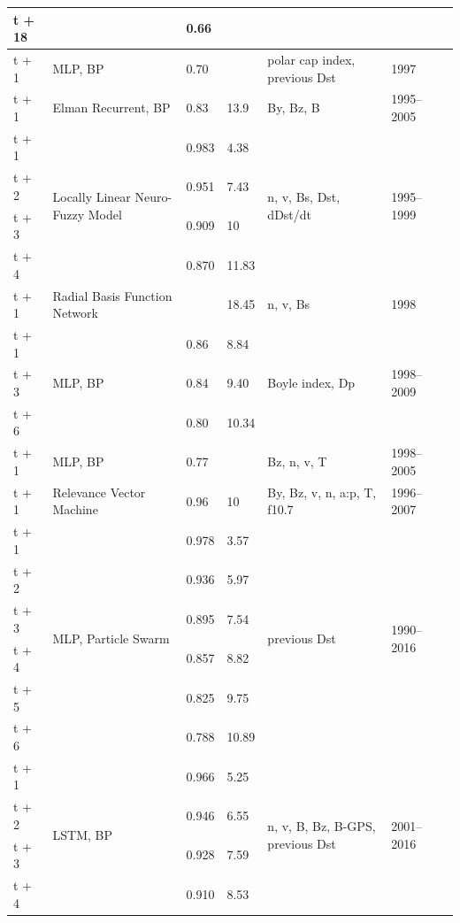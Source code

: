 \documentclass{agujournal2018}
\begin{document}
\begin{table}[htpb]
\begin{tabular}{l p{2.5cm} l l p{2.5cm} p{0.8cm} l}
t + 18 &  & 0.66 &  &&  & \\ \hline
t + 1 & MLP, BP & 0.70 &  & polar cap index, previous Dst & 1997 & \cite{Stepanova2005} \\ \hline
t + 1 & Elman Recurrent, BP & 0.83 & 13.9 & By, Bz, B & 1995--2005 & \cite{Pallocchia2006} \\ \hline
t + 1 & \multirow{4}{2.5cm}{Locally Linear Neuro-Fuzzy Model} & 0.983 & 4.38 & \multirow{4}{2cm}{n, v, Bs, Dst, dDst/dt} &  \multirow{4}{0.8cm}{1995--1999} &  \multirow{4}{*}{\cite{Sharifie2006}} \\ 
t + 2 &  & 0.951 & 7.43 &&  & \\
t + 3 &  & 0.909 & 10 &&  &  \\
t + 4 &  & 0.870 & 11.83 && & \\ \hline
t + 1 & Radial Basis Function Network &  & 18.45 & n, v, Bs & 1998 & \cite{Wei2007} \\ \hline
t + 1 & \multirow{3}{2.5cm}{MLP, BP} & 0.86 & 8.84 & \multirow{3}{2.5cm}{Boyle index, Dp} &  \multirow{3}{0.8cm}{1998--2009}  & \multirow{3}{*}{\cite{Bala2012}} \\
t + 3 &  & 0.84 & 9.40 &&  & \\
t + 6 &  & 0.80 & 10.34 &&  &  \\ \hline
t + 1 & MLP, BP & 0.77 &  & Bz, n, v, T& 1998--2005 & \cite{Revallo2014} \\ \hline
t + 1 & Relevance Vector Machine & 0.96 & 10 & By, Bz, v, n, a:p, T, f10.7 & 1996--2007 & \cite{Andriyas2015} \\ \hline
t + 1 & \multirow{6}{2.5cm}{MLP, Particle Swarm} & 0.978 & 3.57 & \multirow{6}{2.5cm}{previous Dst}&  \multirow{6}{0.8cm}{1990--2016} &  \multirow{6}{*}{\cite{Lazzus2017}} \\
t + 2 &  & 0.936 & 5.97 & & &  \\
t + 3 &  & 0.895 & 7.54 && &  \\
t + 4 &  & 0.857 & 8.82 && &  \\
t + 5 &   & 0.825 & 9.75 && &  \\
t + 6 &  & 0.788 & 10.89 && &  \\ \hline
t + 1 & \multirow{6}{*}{LSTM, BP} & 0.966 & 5.25 & \multirow{6}{2.5cm}{n, v, B, Bz, B-GPS, previous Dst} &  \multirow{6}{0.8cm}{2001--2016} &  \multirow{6}{*}{\cite{Gruet2018}} \\
t + 2 &  & 0.946 & 6.55 &&  &  \\
t + 3 &  & 0.928 & 7.59 &&  &  \\
t + 4 &  & 0.910 & 8.53 &&  &  \\

\end{tabular}
\end{table}
\end{document}
